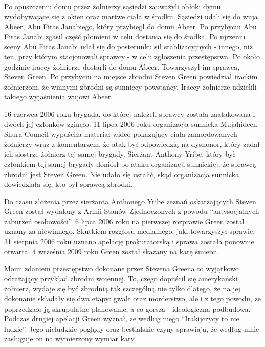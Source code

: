 \documentclass[12pt,a4paper]{article}
\begin{document}
Po opuszczeniu domu przez żołnierzy sąsiedzi zauważyli obłoki dymu
wydobywające się z okien oraz martwe ciała w środku. Sąsiedzi udali
się do wuja Abeer, Abu Firas Janabiego, który przybiegł do domu Abeer.
Po przybyciu Abu Firas Janabi zgasił część płomieni w celu dostania
się do środka. Po ujrzeniu sceny Abu Firas Janabi udał się do
posterunku sił stablizacyjnych - innego, niż ten, przy którym
stacjonowali sprawcy - w celu zgłoszenia przestępstwa. Po około godzinie
iraccy żołnierze dostarli do domu Abeer. Towarzyszył im sprawca,
Steven Green. Po przybyciu na miejsce zbrodni Steven Green powiedział irackim
żołnierzom, że winnymi zbrodni są sunniccy powstańcy. Iraccy żołnierze
udzielili takiego wyjaśnienia wujowi Abeer.


16 czerwca 2006 roku brygada, do której należeli sprawcy została zaatakowana i
dwóch jej członków zginęło. 11 lipca 2006 roku organizacja sunnicka Mujahideen
Shura Council wypuściła materiał wideo pokazujący ciała zamordowanych żołnierzy
wraz z komentarzem, że atak był odpowiedzią na dyshonor, który zadał
ich siostrze żołnierz tej samej brygady. Sierżant Anthony Yribe, który
był członkiem tej samej brygady doniósł po ataku organizacji sunnickiej, że sprawcą zbrodni
jest Steven Green. Nie udało się ustalić, skąd organizacja sunnicka
dowiedziała się, kto był sprawcą zbrodni.


Do czasu złożenia przez sierżanta Anthonego Yribe zeznań oskarżających Steven Green został
wydalony z Armii Stanów Zjednoczonych z powodu ``antysocjalnych
zaburzeń osobowości''. 6 lipca 2006 roku na pierwszej rozprawie Green
został uznany za niewinnego. Skutkiem rozgłosu medialnego, jaki
towarzyszył sprawie, 31 sierpnia 2006 roku uznano apelację prokuratorską i
sprawa została ponownie otwarta. 4 września 2009 roku Green został
skazany na karę śmierci.


Moim zdaniem przestępstwo dokonane przez Stevena Greena to wyjątkowo odrażający przykład
zbrodni wojennej. To, czego dopuścił się amerykański żołnierz, wydaje
się być zbrodnią tak szczególną nie tylko dlatego, że na jej dokonanie
składały się dwa etapy: gwałt oraz morderstwo, ale i z tego powodu, że
poprzedzało ją skrupulatne planowanie, a co gorsza - ideologiczna
podbudowa. Podczas drugiej apelacji Green wyznał, że według niego
``Irakijczycy to nie ludzie''. Jego nieludzkie poglądy oraz
bestialskie czyny sprawiają, że według mnie zasługuje on na wymierzony
wymiar kary.
\end{document}
